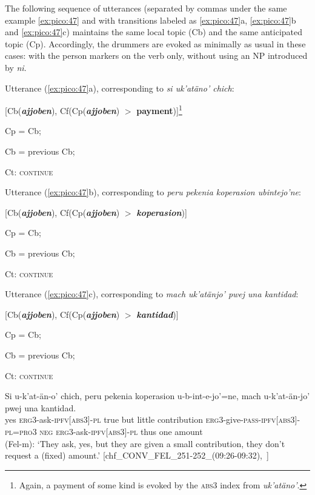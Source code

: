 \documentclass[output=paper
,modfonts
,nonflat]{langsci/langscibook}
\begin{document}
The following sequence of utterances (separated by commas under the same example \ref{ex:pico:47} and with transitions labeled as \ref{ex:pico:47}a, \ref{ex:pico:47}b and \ref{ex:pico:47}c) maintains the same local topic (Cb) and the same anticipated topic (Cp). Accordingly, the drummers are evoked as minimally as usual in these cases: with the person markers on the verb only, without using an NP introduced by \textit{ni}. \newpage

\ea
\ea
Utterance (\ref{ex:pico:47}a), corresponding to \textit{si uk'atäno' chich}:

[Cb(\textbf{\textit{ajjoben}}),  Cf(Cp(\textbf{\textit{ajjoben}}) $>$ \textbf{payment})]\footnote{Again, a payment of some kind is evoked by the \textsc{abs3} index from \textit{uk'atäno'}.}

Cp = Cb;

Cb = previous Cb;

Ct: \textsc{continue}

\ex
Utterance (\ref{ex:pico:47}b), corresponding to \textit{peru pekenia koperasion ubintejo'ne}:

[Cb(\textbf{\textit{ajjoben}}),  Cf(Cp(\textbf{\textit{ajjoben}}) $>$ \textbf{\textit{koperasion}})]

Cp = Cb;

Cb = previous Cb;

Ct: \textsc{continue}

\ex
Utterance (\ref{ex:pico:47}c), corresponding to \textit{mach uk'atänjo' pwej una kantidad}:

[Cb(\textbf{\textit{ajjoben}}), Cf(Cp(\textbf{\textit{ajjoben}}) $>$ \textbf{\textit{kantidad}})]

Cp = Cb;

Cb = previous Cb;

Ct: \textsc{continue}
\z
\z

\ea{}
\label{ex:pico:47}

\gll Si u-k'at-än-o' chich, peru pekenia koperasion u-b-int-e-jo'=ne, mach u-k'at-\"an-jo' pwej una kantidad.
\\
yes \textsc{erg3}-ask-{\textsc{ipfv[abs3]}}-\textsc{pl} true but little contribution \textsc{erg3}-give-\textsc{pass}-{\textsc{ipfv[abs3]}}-\textsc{pl}=\textsc{pro3} {\textsc{neg}} \textsc{erg3}-ask-{\textsc{ipfv[abs3]}}-\textsc{pl} thus one amount\\
\glt (Fel-m): `They ask, yes, but they are given a small contribution, they don't request a (fixed) amount.' [chf\_CONV\_FEL\_251-252\_(09:26-09:32),~\citealt{Delgado-Galvan2018archive}]
\z
\end{document}
